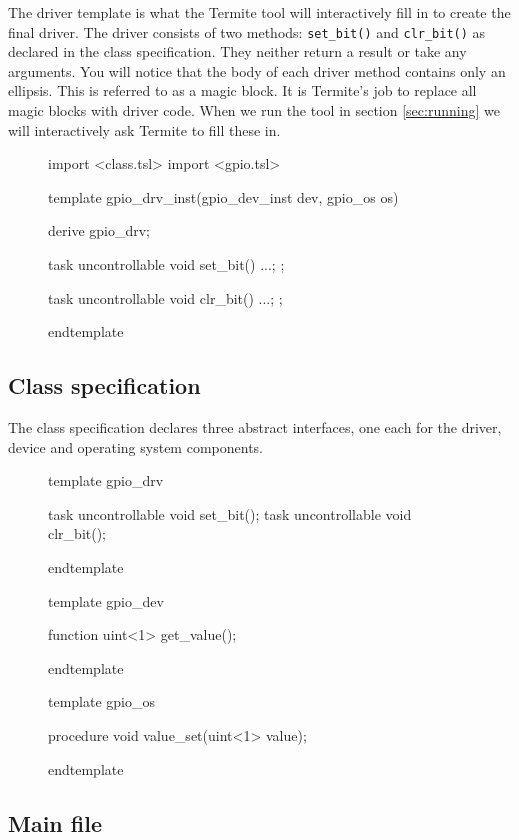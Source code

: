 \documentclass{article}
\newcommand{\code}[1]{\texttt{#1}}
\begin{document}
The driver template is what the Termite tool will interactively fill in to create the final driver. The driver consists of two methods: \code{set\_bit()} and \code{clr\_bit()} as declared in the class specification. They neither return a result or take any arguments. You will notice that the body of each driver method contains only an ellipsis. This is referred to as a magic block. It is Termite's job to replace all magic blocks with driver code. When we run the tool in section \ref{sec:running} we will interactively ask Termite to fill these in.

\begin{figure}[H]
\lstset{numbers=left}
\begin{tsllisting}
import <class.tsl>
import <gpio.tsl>

template gpio_drv_inst(gpio_dev_inst dev, gpio_os os)

derive gpio_drv;

task uncontrollable void set_bit(){
    ...;
};

task uncontrollable void clr_bit(){
    ...;
};

endtemplate
\end{tsllisting}
\end{figure}

\subsection{Class specification}

The class specification declares three abstract interfaces, one each for the driver, device and operating system components. 

\begin{figure}[H]
\lstset{numbers=left}
\begin{tsllisting}
template gpio_drv

task uncontrollable void set_bit();
task uncontrollable void clr_bit();

endtemplate

template gpio_dev

function uint<1> get_value();

endtemplate

template gpio_os

procedure void value_set(uint<1> value);

endtemplate
\end{tsllisting}
\end{figure}
\subsection{Main file}
\end{document}
